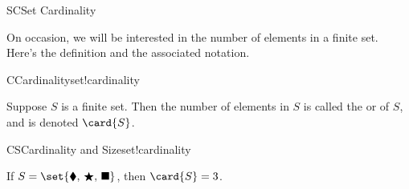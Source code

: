 %
\begin{subsect}{SC}{Set Cardinality}
%
\begin{para}On occasion, we will be interested in the number of elements in a finite set.  Here's the definition and the associated notation.\end{para}
%
\begin{definition}{C}{Cardinality}{set!cardinality}
\begin{para}Suppose $S$ is a finite set.  Then the number of elements in $S$ is called the  or  of $S$, and is denoted $\card{S}$.\end{para}
%
\end{definition}
%
\begin{example}{CS}{Cardinality and Size}{set!cardinality}
\begin{para}If $S=\set{\blacklozenge,\,\bigstar,\,\blacksquare}$, then $\card{S}=3$.\end{para}
\end{example}
%
\end{subsect}
%
